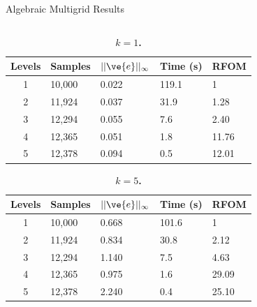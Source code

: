 \documentclass{beamer}
\begin{document}
\begin{frame}{Algebraic Multigrid Results}

  \begin{columns}

    \begin{column}{0.5\textwidth}

      { \tiny
        \begin{table}[h!]
          \begin{center}
            \begin{tabular}{cllll}\hline\hline
              \multicolumn{1}{c}{\textbf{Levels}} & 
              \multicolumn{1}{l}{\textbf{Samples}} & 
              \multicolumn{1}{l}{\textbf{$||\ve{e}||_{\infty}$}} & 
              \multicolumn{1}{l}{\textbf{Time (s)}} & 
              \multicolumn{1}{l}{\textbf{RFOM}} \\
              \hline
              1 & 10,000 & 0.022 & 119.1 & 1 \\
              2 & 11,924 & 0.037 & 31.9 & 1.28 \\
              3 & 12,294 & 0.055 & 7.6 & 2.40 \\
              4 & 12,365 & 0.051 & 1.8 & 11.76 \\
              5 & 12,378 & 0.094 & 0.5 & 12.01 \\
              \hline\hline
            \end{tabular}
          \end{center}
          \caption{\textbf{$k = 1$.}}
          \label{tab:ml_k1_results}
        \end{table}
      }

      \vspace{-0.25in}

      { \tiny
        \begin{table}[h!]
          \begin{center}
            \begin{tabular}{cllll}\hline\hline
              \multicolumn{1}{c}{\textbf{Levels}} & 
              \multicolumn{1}{l}{\textbf{Samples}} & 
              \multicolumn{1}{l}{\textbf{$||\ve{e}||_{\infty}$}} & 
              \multicolumn{1}{l}{\textbf{Time (s)}} & 
              \multicolumn{1}{l}{\textbf{RFOM}} \\
              \hline
              1 & 10,000 & 0.668 & 101.6 & 1 \\
              2 & 11,924 & 0.834 & 30.8 & 2.12 \\
              3 & 12,294 & 1.140 & 7.5 & 4.63 \\
              4 & 12,365 & 0.975 & 1.6 & 29.09 \\
              5 & 12,378 & 2.240 & 0.4 & 25.10 \\
              \hline\hline
            \end{tabular}
          \end{center}
          \caption{\textbf{$k = 5$.}}
          \label{tab:ml_k5_results}
        \end{table}
      }


\end{column}
\end{columns}
\end{frame}
\end{document}
